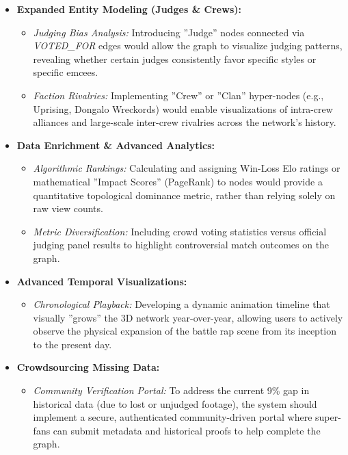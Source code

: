 \documentclass[12pt,a4paper]{article}
\begin{document}
\begin{itemize}
    \item \textbf{Expanded Entity Modeling (Judges \& Crews):} 
    \begin{itemize}
        \item \textit{Judging Bias Analysis:} Introducing ''Judge'' nodes connected via \textit{VOTED\_FOR} edges would allow the graph to visualize judging patterns, revealing whether certain judges consistently favor specific styles or specific emcees.
        \item \textit{Faction Rivalries:} Implementing ''Crew'' or ''Clan'' hyper-nodes (e.g., Uprising, Dongalo Wreckords) would enable visualizations of intra-crew alliances and large-scale inter-crew rivalries across the network's history.
    \end{itemize}
    
    \item \textbf{Data Enrichment \& Advanced Analytics:}
    \begin{itemize}
        \item \textit{Algorithmic Rankings:} Calculating and assigning Win-Loss Elo ratings or mathematical ''Impact Scores'' (PageRank) to nodes would provide a quantitative topological dominance metric, rather than relying solely on raw view counts.
        \item \textit{Metric Diversification:} Including crowd voting statistics versus official judging panel results to highlight controversial match outcomes on the graph.
    \end{itemize}
    
    \item \textbf{Advanced Temporal Visualizations:}
    \begin{itemize}
        \item \textit{Chronological Playback:} Developing a dynamic animation timeline that visually ''grows'' the 3D network year-over-year, allowing users to actively observe the physical expansion of the battle rap scene from its inception to the present day.
    \end{itemize}
    
    \item \textbf{Crowdsourcing Missing Data:}
    \begin{itemize}
        \item \textit{Community Verification Portal:} To address the current 9\% gap in historical data (due to lost or unjudged footage), the system should implement a secure, authenticated community-driven portal where super-fans can submit metadata and historical proofs to help complete the graph.
    \end{itemize}
\end{itemize}
\end{document}
